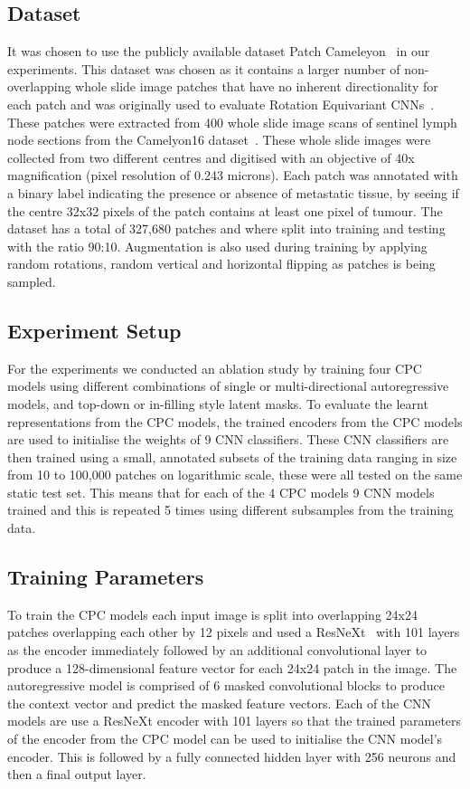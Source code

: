 \subsection{Dataset}
\label{subsec:unsupervised_dataset}
It was chosen to use the publicly available dataset Patch Cameleyon~\citep{veeling2018rotation} in our experiments. This dataset was chosen as it contains a larger number of non-overlapping whole slide image patches that have no inherent directionality for each patch and was originally used to evaluate Rotation Equivariant CNNs~\citep{veeling2018rotation}. These patches were extracted from 400 whole slide image scans of sentinel lymph node sections from the Camelyon16 dataset~\citep{litjens20181399}. These whole slide images were collected from two different centres and digitised with an objective of 40x magnification (pixel resolution of 0.243 microns). Each patch was annotated with a binary label indicating the presence or absence of metastatic tissue, by seeing if the centre 32x32 pixels of the patch contains at least one pixel of tumour. The dataset has a total of 327,680 patches and where split into training and testing with the ratio 90:10. Augmentation is also used during training by applying random rotations, random vertical and horizontal flipping as patches is being sampled.

\subsection{Experiment Setup}
\label{subsec:unsupervised_experiment}
For the experiments we conducted an ablation study by training four CPC models using different combinations of single or multi-directional autoregressive models, and top-down or in-filling style latent masks. To evaluate the learnt representations from the CPC models, the trained encoders from the CPC models are used to initialise the weights of 9 CNN classifiers. These CNN classifiers are then trained using a small, annotated subsets of the training data ranging in size from 10 to 100,000 patches on logarithmic scale, these were all tested on the same static test set. This means that for each of the 4 CPC models 9 CNN models trained and this is repeated 5 times using different subsamples from the training data. 

\subsection{Training Parameters}
\label{subsec:unsupervised_training}
To train the CPC models each input image is split into overlapping 24x24 patches overlapping each other by 12 pixels and used a ResNeXt~\citep{xie2017aggregated} with 101 layers as the encoder immediately followed by an additional convolutional layer to produce a 128-dimensional feature vector for each 24x24 patch in the image. The autoregressive model is comprised of 6 masked convolutional blocks to produce the context vector and predict the masked feature vectors. Each of the CNN models are use a ResNeXt encoder with 101 layers so that the trained parameters of the encoder from the CPC model can be used to initialise the CNN model’s encoder. This is followed by a fully connected hidden layer with 256 neurons and then a final output layer.

